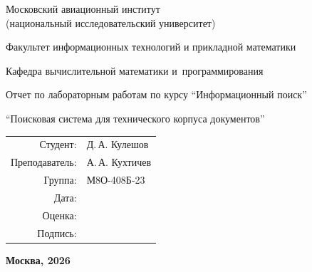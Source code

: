 \begin{titlepage}
\begin{center}
\bfseries

{\Large Московский авиационный институт\\ (национальный исследовательский университет)

}

\vspace{48pt}

{\large Факультет информационных технологий и прикладной математики
}

\vspace{36pt}

{\large Кафедра вычислительной математики и~программирования

}


\vspace{48pt}

Отчет по лабораторным работам по курсу \enquote{Информационный поиск}

\vspace{18pt}

\enquote{Поисковая система для технического корпуса документов}

\end{center}

\vspace{72pt}

\begin{flushright}
\begin{tabular}{rl}
Студент: & Д.\,А. Кулешов \\
Преподаватель: & А.\,А. Кухтичев \\
Группа: & М8О-408Б-23 \\
Дата: & \\
Оценка: & \\
Подпись: & \\
\end{tabular}
\end{flushright}

\vfill

\begin{center}
\bfseries
Москва, 2026
\end{center}
\end{titlepage}

\pagebreak
